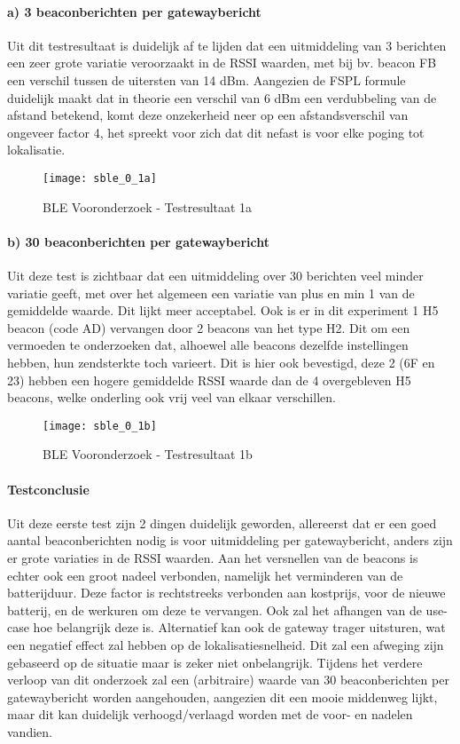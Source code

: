 \paragraph{a) 3 beaconberichten per gatewaybericht}
Uit dit testresultaat is duidelijk af te lijden dat een uitmiddeling van 3 berichten een zeer grote variatie veroorzaakt in de RSSI waarden, met bij bv. beacon FB een verschil tussen de uitersten van 14 dBm. Aangezien de FSPL formule duidelijk maakt dat in theorie een verschil van 6 dBm een verdubbeling van de afstand betekend, komt deze onzekerheid neer op een afstandsverschil van ongeveer factor 4, het spreekt voor zich dat dit nefast is voor elke poging tot lokalisatie.

\begin{figure}[h]
	\texttt{[image: sble\_0\_1a]}
	\caption{BLE Vooronderzoek - Testresultaat 1a}
	\label{fig:ond-ble-1a-res}
\end{figure}

\paragraph{b) 30 beaconberichten per gatewaybericht}
Uit deze test is zichtbaar dat een uitmiddeling over 30 berichten veel minder variatie geeft, met over het algemeen een variatie van plus en min 1 van de gemiddelde waarde. Dit lijkt meer acceptabel. Ook is er in dit experiment 1 H5 beacon (code AD) vervangen door 2 beacons van het type H2. Dit om een vermoeden te onderzoeken dat, alhoewel alle beacons dezelfde instellingen hebben, hun zendsterkte toch varieert. Dit is hier ook bevestigd, deze 2 (6F en 23) hebben een hogere gemiddelde RSSI waarde dan de 4 overgebleven H5 beacons, welke onderling ook vrij veel van elkaar verschillen.

\begin{figure}[h]
	\texttt{[image: sble\_0\_1b]}
	\caption{BLE Vooronderzoek - Testresultaat 1b}
	\label{fig:ond-ble-1b-res}
\end{figure}

\paragraph{Testconclusie}
Uit deze eerste test zijn 2 dingen duidelijk geworden, allereerst dat er een goed aantal beaconberichten nodig is voor uitmiddeling per gatewaybericht, anders zijn er grote variaties in de RSSI waarden. Aan het versnellen van de beacons is echter ook een groot nadeel verbonden, namelijk het verminderen van de batterijduur. Deze factor is rechtstreeks verbonden aan kostprijs, voor de nieuwe batterij, en de werkuren om deze te vervangen. Ook zal het afhangen van de use-case hoe belangrijk deze is. Alternatief kan ook de gateway trager uitsturen, wat een negatief effect zal hebben op de lokalisatiesnelheid. Dit zal een afweging zijn gebaseerd op de situatie maar is zeker niet onbelangrijk. Tijdens het verdere verloop van dit onderzoek zal een (arbitraire) waarde van 30 beaconberichten per gatewaybericht worden aangehouden, aangezien dit een mooie middenweg lijkt, maar dit kan duidelijk verhoogd/verlaagd worden met de voor- en nadelen vandien.

